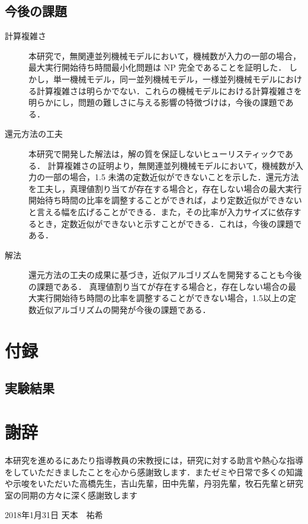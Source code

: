 \documentclass[12pt]{optlab-bachelor}
\def\氏名{天本　祐希}
\begin{document}
\section{今後の課題}
\begin{description}
  \item[計算複雑さ ] 本研究で，無関連並列機械モデルにおいて，機械数が入力の一部の場合，最大実行開始待ち時間最小化問題は NP 完全であることを証明した．
  しかし，単一機械モデル，同一並列機械モデル，一様並列機械モデルにおける計算複雑さは明らかでない．これらの機械モデルにおける計算複雑さを明らかにし，問題の難しさに与える影響の特徴づけは，今後の課題である．

  \item[還元方法の工夫 ] 本研究で開発した解法は，解の質を保証しないヒューリスティックである．
  計算複雑さの証明より，無関連並列機械モデルにおいて，機械数が入力の一部の場合，1.5 未満の定数近似ができないことを示した．還元方法を工夫し，真理値割り当てが存在する場合と，存在しない場合の最大実行開始待ち時間の比率を調整することができれば，より定数近似ができないと言える幅を広げることができる．また，その比率が入力サイズに依存するとき，定数近似ができないと示すことができる．これは，今後の課題である．

  \item[解法 ]
  還元方法の工夫の成果に基づき，近似アルゴリズムを開発することも今後の課題である．
  真理値割り当てが存在する場合と，存在しない場合の最大実行開始待ち時間の比率を調整することができない場合，1.5以上の定数近似アルゴリズムの開発が今後の課題である．

\end{description}

\chapter{付録}\label{c_7}
\section{実験結果}






\chapter*{謝辞}
本研究を進めるにあたり指導教員の宋教授には，研究に対する助言や熱心な指導をしていただきましたことを心から感謝致します．またゼミや日常で多くの知識や示唆をいただいた高橋先生，吉山先輩，田中先輩，丹羽先輩，牧石先輩と研究室の同期の方々に深く感謝致します

\begin{flushright}
  2018年1月31日 \氏名
\end{flushright}
\endmatter
\end{document}
